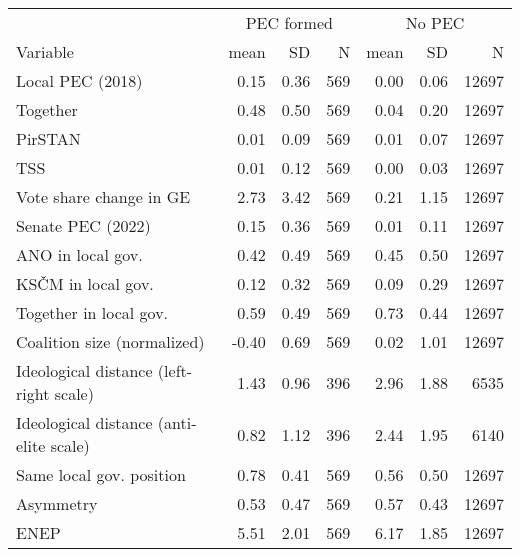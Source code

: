 
\begin{tabular}{l|rrr|rrr|}
\hline
 & \multicolumn{3}{|c|}{PEC formed} & \multicolumn{3}{c|}{No PEC} \\
Variable & mean & SD & N & mean & SD & N \\
\hline
Local PEC (2018) & 0.15 & 0.36 & 569 & 0.00 & 0.06 & 12697\\
\hline
Together & 0.48 & 0.50 & 569 & 0.04 & 0.20 & 12697\\
\hline
PirSTAN & 0.01 & 0.09 & 569 & 0.01 & 0.07 & 12697\\
\hline
TSS & 0.01 & 0.12 & 569 & 0.00 & 0.03 & 12697\\
\hline
Vote share change in GE & 2.73 & 3.42 & 569 & 0.21 & 1.15 & 12697\\
\hline
Senate PEC (2022) & 0.15 & 0.36 & 569 & 0.01 & 0.11 & 12697\\
\hline
ANO in local gov. & 0.42 & 0.49 & 569 & 0.45 & 0.50 & 12697\\
\hline
KSČM in local gov. & 0.12 & 0.32 & 569 & 0.09 & 0.29 & 12697\\
\hline
Together in local gov. & 0.59 & 0.49 & 569 & 0.73 & 0.44 & 12697\\
\hline
Coalition size (normalized) & -0.40 & 0.69 & 569 & 0.02 & 1.01 & 12697\\
\hline
Ideological distance (left-right scale) & 1.43 & 0.96 & 396 & 2.96 & 1.88 & 6535\\
\hline
Ideological distance (anti-elite scale) & 0.82 & 1.12 & 396 & 2.44 & 1.95 & 6140\\
\hline
Same local gov. position & 0.78 & 0.41 & 569 & 0.56 & 0.50 & 12697\\
\hline
Asymmetry & 0.53 & 0.47 & 569 & 0.57 & 0.43 & 12697\\
\hline
ENEP & 5.51 & 2.01 & 569 & 6.17 & 1.85 & 12697\\
\hline
\end{tabular}
